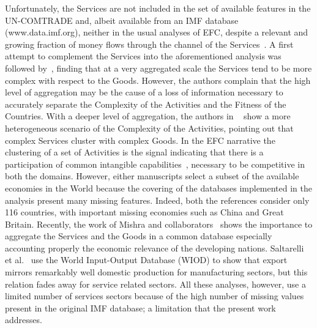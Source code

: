 \documentclass[fleqn,10pt]{article}
\begin{document}
Unfortunately, the Services are not included in the set of available features in the UN-COMTRADE and, albeit available from an IMF database (www.data.imf.org), neither in the usual analyses of EFC, despite a relevant and growing fraction of money flows through the channel of the Services~\cite{loungani2017world}.
A first attempt to complement the Services into the aforementioned analysis was followed by~\cite{Stojkoski2016}, finding that at a very aggregated scale the Services tend to be more complex with respect to the Goods.
However, the authors complain that the high level of aggregation may be the cause of a loss of information necessary to accurately separate the Complexity of the Activities and the Fitness of the Countries.
With a deeper level of aggregation, the authors in ~\cite{Zaccaria2018services} show a more heterogeneous scenario of the Complexity of the Activities, pointing out that complex Services cluster with complex Goods.
In the EFC narrative the clustering of a set of Activities is the signal indicating that there is a participation of common intangible capabilities~\cite{Cristelli2013}, necessary to be competitive in both the domains.
However, either manuscripts select a subset of the available economies in the World because the covering of the databases implemented in the analysis present many missing features.
Indeed, both the references consider only 116 countries, with important missing economies such as China and Great Britain. 
Recently, the work of Mishra and collaborators~\cite{Mishra2020} shows the importance to aggregate the Services and the Goods in a common database especially accounting properly the economic relevance of the developing nations. 
Saltarelli et al.~\cite{saltarelli2020export} use the World Input-Output Database (WIOD) to show that export mirrors remarkably well domestic production for manufacturing sectors, but this relation fades away for service related sectors. 
All these analyses, however, use a limited number of services sectors because of the high number of missing values present in the original IMF database; a limitation that the present work addresses.
\end{document}
